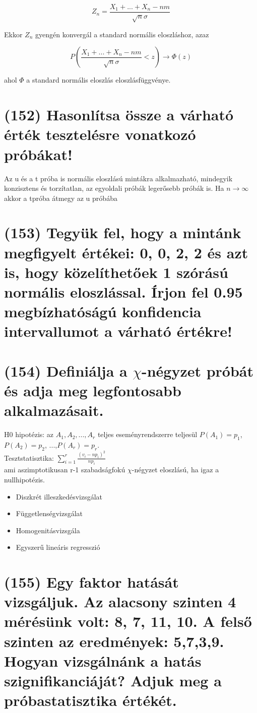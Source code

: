 \documentclass[12p]{article}
\begin{document}
$$Z_n = \frac{X_1 + ... + X_n -nm}{\sqrt{n}\sigma}$$

Ekkor $Z_n$ gyengén konvergál a standard normális eloszláshoz,
azaz

$$P(\frac{X_1 + ... + X_n - nm}{\sqrt{n}\sigma} < z) \rightarrow \Phi(z)$$

ahol $\Phi$ a standard normális eloszlás eloszlásfüggvénye.

\section{(152) Hasonlítsa össze a várható érték tesztelésre vonatkozó próbákat!}

Az u és a t próba is normális eloszlású mintákra alkalmazható, mindegyik konzisztens és torzítatlan, az egyoldali próbák legerősebb próbák is. Ha $n \rightarrow \infty$ akkor a tpróba átmegy az u próbába

\section{(153) Tegyük fel, hogy a mintánk megfigyelt értékei: 0, 0, 2, 2 és azt is, hogy közelíthetőek 1 szórású normális eloszlással. Írjon fel 0.95 megbízhatóságú konfidencia intervallumot a várható értékre!}

\section{(154) Definiálja a $\chi$-négyzet próbát és adja meg legfontosabb alkalmazásait.}

H0 hipotézis: az $A_1, A_2, ..., A_r$ teljes eseményrendszerre teljesül $P(A_1)=p_1$, $P(A_2)=p_2$, ...,$P(A_r)=p_r$.\\
Tesztstatisztika: $\displaystyle{ \sum^r_{i=1} \frac{(v_i - np_i)^2}{np_i}}$\\
ami aszimptotikusan r-1 szabadságfokú $\chi$-négyzet eloszlású, ha igaz a nullhipotézis. 

\begin{itemize}
	\item Diszkrét illeszkedésvizsgálat
	\item Függetlenségvizsgálat
	\item Homogenitásvizsgála
	\item Egyszerű lineáris regresszió
\end{itemize}

\section{(155) Egy faktor hatását vizsgáljuk. Az alacsony szinten 4 mérésünk volt: 8, 7, 11, 10. A felső
szinten az eredmények: 5,7,3,9. Hogyan vizsgálnánk a hatás szignifikanciáját? Adjuk meg
a próbastatisztika értékét.}
\end{document}
